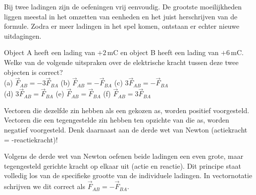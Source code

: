 \documentclass{ximera}
\begin{document}
Bij twee ladingen zijn de oefeningen vrij eenvoudig. De grootste moeilijkheden liggen meestal in het omzetten van eenheden en het juist herschrijven van de formule. Zodra er meer ladingen in het spel komen, ontstaan er echter nieuwe uitdagingen.

\vspace{2mm}
\begin{question}\label{q:actiereactie}\nl
    Object A heeft een lading van $+2 \, \mathrm{mC}$ en object B heeft een lading van $+6 \, \mathrm{mC}$. Welke van de volgende uitspraken over de elektrische kracht tussen deze twee objecten is correct?\\[1ex]
    (a) $\vec{F}_{AB} = -3\vec{F}_{BA}$ \quad
    (b) $\vec{F}_{AB} = -\vec{F}_{BA}$ \quad
    (c) $3\vec{F}_{AB} = -\vec{F}_{BA}$ \\
    (d) $3\vec{F}_{AB} = \vec{F}_{BA}$ \quad
    (e) $\vec{F}_{AB} = \vec{F}_{BA}$ \quad
    (f) $\vec{F}_{AB} = 3\vec{F}_{BA}$
    
    \begin{hint}
        Vectoren die dezelfde zin hebben als een gekozen as, worden positief voorgesteld. Vectoren die een tegengestelde zin hebben ten opzichte van die as, worden negatief voorgesteld. Denk daarnaast aan de derde wet van Newton (actiekracht = -reactiekracht)!
    \end{hint}

    \begin{onlineOnly}
        \begin{multipleChoice}
        \end{multipleChoice}
        
        \begin{solution}\nl
            Volgens de derde wet van Newton oefenen beide ladingen een even grote, maar tegengesteld gerichte kracht op elkaar uit (actie en reactie). Dit principe staat volledig los van de specifieke grootte van de individuele ladingen. In vectornotatie schrijven we dit correct als $\vec{F}_{AB} = -\vec{F}_{BA}$.
        \end{solution}
    \end{onlineOnly}
\end{question}
\end{document}
